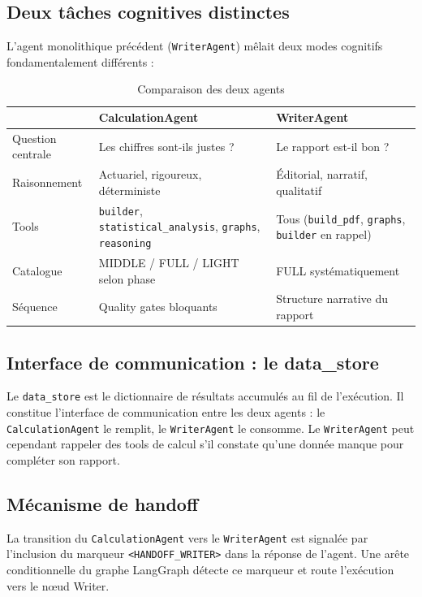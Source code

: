 \documentclass[12pt, a4paper]{article}
\begin{document}
\subsection{Deux tâches cognitives distinctes}

L'agent monolithique précédent (\texttt{WriterAgent}) mêlait deux modes
cognitifs fondamentalement différents :

\begin{table}[h]
\centering
\begin{tabularx}{\textwidth}{lXX}
\toprule
 & CalculationAgent & WriterAgent\\
\midrule
Question centrale & Les chiffres sont-ils justes ? & Le rapport est-il bon ?\\
Raisonnement & Actuariel, rigoureux, déterministe & Éditorial, narratif, qualitatif\\
Tools & \texttt{builder}, \texttt{statistical\_analysis}, \texttt{graphs}, \texttt{reasoning} & Tous (\texttt{build\_pdf}, \texttt{graphs}, \texttt{builder} en rappel)\\
Catalogue & MIDDLE / FULL / LIGHT selon phase & FULL systématiquement\\
Séquence & Quality gates bloquants & Structure narrative du rapport\\
\bottomrule
\end{tabularx}
\caption{Comparaison des deux agents}
\end{table}

\subsection{Interface de communication : le data\_store}

Le \texttt{data\_store} est le dictionnaire de résultats accumulés au fil
de l'exécution. Il constitue l'interface de communication entre les deux
agents : le \texttt{CalculationAgent} le remplit, le \texttt{WriterAgent}
le consomme. Le \texttt{WriterAgent} peut cependant rappeler des tools de
calcul s'il constate qu'une donnée manque pour compléter son rapport.

\subsection{Mécanisme de handoff}

La transition du \texttt{CalculationAgent} vers le \texttt{WriterAgent} est
signalée par l'inclusion du marqueur \texttt{<HANDOFF\_WRITER>} dans la
réponse de l'agent. Une arête conditionnelle du graphe LangGraph détecte
ce marqueur et route l'exécution vers le nœud Writer.
\end{document}
